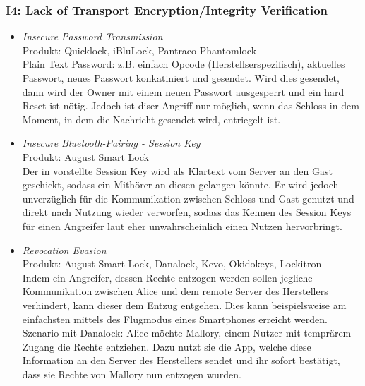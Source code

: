     \subsubsection*{I4: Lack of Transport Encryption/Integrity Verification}
        \begin{itemize}[leftmargin=0cm,label={}]
            \item \emph{Insecure Password Transmission}\cite{Rose2016}\label{vuln:pwdtrns}\\
                Produkt: Quicklock, iBluLock, Pantraco Phantomlock\\
                Plain Text Password: z.B. einfach Opcode (Herstellserspezifisch), aktuelles Passwort, neues Passwort konkatiniert und gesendet. 
    	        Wird dies gesendet, dann wird der Owner mit einem neuen Passwort ausgesperrt und ein hard Reset ist nötig. 
    	        Jedoch ist diser Angriff nur möglich, wenn das Schloss in dem Moment, in dem die Nachricht gesendet wird, entriegelt ist.
            \item \emph{Insecure Bluetooth-Pairing - Session Key}\cite{Fuller2017}\label{vuln:blesk}\\
                Produkt: August Smart Lock\\
                Der in  vorstellte Session Key wird als Klartext vom Server an den Gast geschickt, sodass ein Mithörer an diesen gelangen könnte.
    	        Er wird jedoch unverzüglich für die Kommunikation zwischen Schloss und Gast genutzt und direkt nach Nutzung wieder verworfen, sodass das Kennen des Session Keys für einen Angreifer laut \citeauthor{Fuller2017} eher unwahrscheinlich einen Nutzen hervorbringt.
	        \item \emph{Revocation Evasion}\cite{Fuller2017,Ho2016}\label{vuln:revocationevasion}\\
                Produkt: August Smart Lock, Danalock, Kevo, Okidokeys, Lockitron\\
                Indem ein Angreifer, dessen Rechte entzogen werden sollen jegliche Kommunikation zwischen Alice und dem remote Server des Herstellers verhindert, kann dieser dem Entzug entgehen.
                Dies kann beispielsweise am einfachsten mittels des Flugmodus eines Smartphones erreicht werden.\\
                Szenario mit Danalock: Alice möchte Mallory, einem Nutzer mit temprärem Zugang die Rechte entziehen. 
                Dazu nutzt sie die App, welche diese Information an den Server des Herstellers sendet und ihr sofort bestätigt, dass sie Rechte von Mallory nun entzogen wurden. 

\end{itemize}
